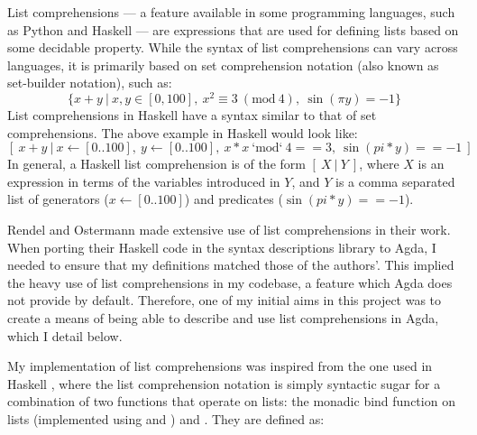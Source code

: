 \documentclass[12pt,a4paper,twoside,openright]{report}
\newcommand{\F}{\AgdaFunction}
\begin{document}
List comprehensions --- a feature available in some programming languages, such as Python and Haskell --- are expressions that are used for defining lists based on some decidable property. While the syntax of list comprehensions can vary across languages, it is primarily based on set comprehension notation (also known as set-builder notation), such as:
$$ \{ x + y\  |\  x,y \in [0,100],\ x^2 \equiv 3\ (\textrm{mod}\ 4),\ \sin(\pi y) = -1\} $$
List comprehensions in Haskell have a syntax similar to that of set comprehensions. The above example in Haskell would look like:
$$[\ x+y\ |\ x \leftarrow [0..100],\ y \leftarrow [0..100],\ x*x\ \textrm{`mod`}\ 4 == 3,\ \sin{(pi*y)} == -1\ ]$$
In general, a Haskell list comprehension is of the form $[\ X\ |\ Y\ ]$, where $X$ is an expression in terms of the variables introduced in $Y$, and $Y$ is a comma separated list of generators ($x \leftarrow [0..100]$) and predicates ($\sin{(pi * y)} == -1$). 

Rendel and Ostermann made extensive use of list comprehensions in their work. When porting their Haskell code in the syntax descriptions library to Agda, I needed to ensure that my definitions matched those of the authors'. This implied the heavy use of list comprehensions in my codebase, a feature which Agda does not provide by default. Therefore, one of my initial aims in this project was to create a means of being able to describe and use list comprehensions in Agda, which I detail below. 

My implementation of list comprehensions was inspired from the one used in Haskell \cite{monad-comps}, where the list comprehension notation is simply syntactic sugar for a combination of two functions that operate on lists: the monadic bind function on lists \F{>\!\!>\!=$_l$} (implemented using \F{concat} and \F{map}) and \F{return}. They are defined as:

\end{document}
